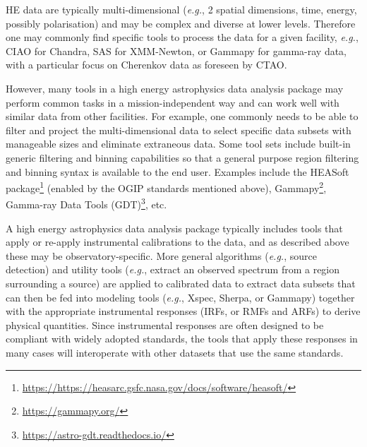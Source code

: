 \documentclass[11pt,a4paper]{ivoa}
\begin{document}
{%
%
%
%
%


\gls{HE} data are typically multi-dimensional ({\em e.g.\/}, 2 spatial dimensions, time, energy, possibly polarisation) and may be complex and diverse at lower levels.  Therefore one may commonly find specific tools to process the data for a given facility, {\em e.g.\/}, CIAO for Chandra, \gls{SAS} for \gls{XMM-Newton}, or Gammapy for gamma-ray data, with a particular focus on Cherenkov data as foreseen by \gls{CTAO}.

However, many tools in a high energy astrophysics data analysis package may perform common tasks in a mission-independent way and can work well with similar data from other facilities.  For example, one commonly needs to be able to filter and project the multi-dimensional data to select specific data subsets with manageable sizes and eliminate extraneous data.  Some tool sets include built-in generic filtering and binning capabilities so that a general purpose region filtering and binning syntax is available to the end user.  Examples include the HEASoft package\footnote{\url{https://https://heasarc.gsfc.nasa.gov/docs/software/heasoft/}} (enabled by the OGIP standards mentioned above), Gammapy\footnote{\url{https://gammapy.org/}}, Gamma-ray Data Tools (GDT)\footnote{\url{https://astro-gdt.readthedocs.io/}}, etc.  

A high energy astrophysics data analysis package typically includes tools that apply or re-apply instrumental calibrations to the data, and as described above these may be observatory-specific.  More general algorithms ({\em e.g.\/}, source detection) and utility tools ({\em e.g.\/}, extract an observed spectrum from a region surrounding a source) are applied to calibrated data to extract data subsets that can then be fed into modeling tools ({\em e.g.\/}, Xspec, Sherpa, or Gammapy) together with the appropriate instrumental responses (\gls{IRF}s, or \gls{RMF}s and \gls{ARF}s) to derive physical quantities.  Since instrumental responses are often designed to be compliant with widely adopted standards, the tools that apply these responses in many cases will interoperate with other datasets that use the same standards.

}
\end{document}
